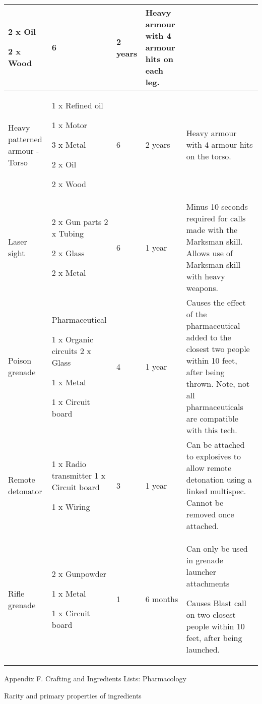 \documentclass{scrbook}
\begin{document}
\begin{table}
\begin{tabular}{|l|l|l|l|l|}
2 x Oil\par 2 x Wood & 6 & 2 years & Heavy armour with 4 armour hits on each leg. \\
 \hline Heavy patterned armour - Torso & 1 x Refined oil\par 1 x Motor\par 3 x Metal\par 2 x Oil\par 2 x Wood & 6 & 2 years & Heavy armour with 4 armour hits on the torso. \\
 \hline Laser sight & 2 x Gun parts 2 x Tubing\par 2 x Glass\par 2 x Metal & 6 & 1 year & Minus 10 seconds required for calls made with the Marksman skill. Allows use of Marksman skill with heavy weapons. \\
 \hline Poison grenade & Pharmaceutical\par 1 x Organic circuits 2 x Glass\par 1 x Metal\par 1 x Circuit board & 4 & 1 year & Causes the effect of the pharmaceutical added to the closest two people within 10 feet, after being thrown. Note, not all pharmaceuticals are compatible with this tech. \\
 \hline Remote detonator & 1 x Radio transmitter 1 x Circuit board\par 1 x Wiring & 3 & 1 year & Can be attached to explosives to allow remote detonation using a linked multispec. Cannot be removed once attached. \\
 \hline Rifle grenade & 2 x Gunpowder\par 1 x Metal\par 1 x Circuit board & 1 & 6 months & Can only be used in grenade launcher attachments\par Causes Blast call on two closest people within 10 feet, after being launched. \\
 \hline \end{tabular}

\end{table}

Appendix F. Crafting and Ingredients Lists: Pharmacology

Rarity and primary properties of ingredients
\end{document}
